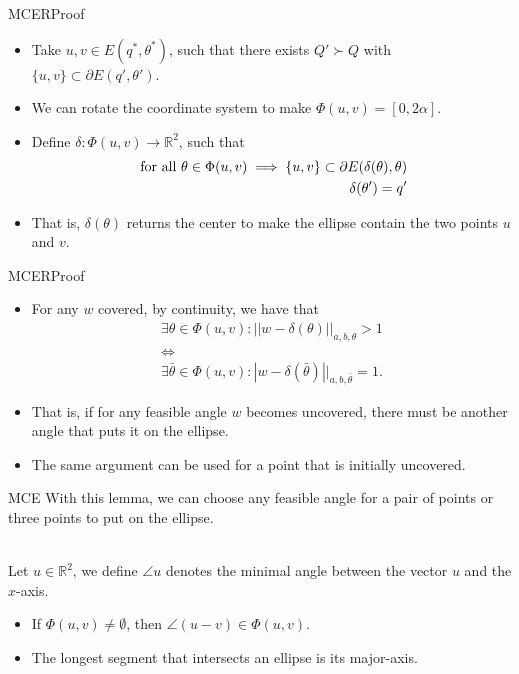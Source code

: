 \documentclass{beamer}
\newcommand{\R}{\mathbb{R}}
\theoremstyle{definition}
\begin{document}
\begin{frame}{MCER}{Proof}
	\begin{itemize}
		\item Take $u, v \in E(q^*, \theta^*)$, such that there exists $Q'\succ Q$ with $\{u,v\} \subset \partial E(q', \theta')$.
		
		\item We can rotate the coordinate system to make $\Phi(u,v) = [0, 2\alpha]$.
		
		\item Define $\delta \colon \Phi(u,v) \to \R^2$, such that 
		\begin{eqnarray*}
		\textnormal{ for all }\theta \in \Phi(u,v)\implies \{u,v\} \subset \partial E(\delta(\theta), \theta)\\
		\delta(\theta')=q'
		\end{eqnarray*}
	
		\item That is, $\delta(\theta)$ returns the center to make the ellipse contain the two points $u$ and $v$.
	
	\end{itemize}
\end{frame}

\begin{frame}{MCER}{Proof}
	\begin{itemize}
		\item For any $w$ covered, by continuity, we have that
		\begin{eqnarray*}
		\exists \theta \in \Phi(u,v)\colon||w-\delta(\theta)||_{a,b,\theta} > 1\\ 
		\Leftrightarrow\\
		\exists \bar{\theta} \in \Phi(u,v) \colon |w-\delta(\bar{\theta})||_{a,b,\bar{\theta}}=1.
		\end{eqnarray*}
		
		\item That is, if for any feasible angle $w$ becomes uncovered, there must be another angle that puts it on the ellipse.
		
		\item The same argument can be used for a point that is initially uncovered.
	\end{itemize}
\end{frame}

\begin{frame}{MCE}
	With this lemma, we can choose any feasible angle for a pair of points or three points to put on the ellipse.
	\\~\
	
	Let $u \in \R^2$, we define $\angle u$ denotes the minimal angle between the vector $u$ and the $x$-axis.
	
	\begin{itemize}
		\item If $\Phi(u,v) \neq \emptyset$, then $\angle (u-v) \in \Phi(u,v)$.
		\item The longest segment that intersects an ellipse is its major-axis.
	\end{itemize}
\end{frame}
\end{document}
